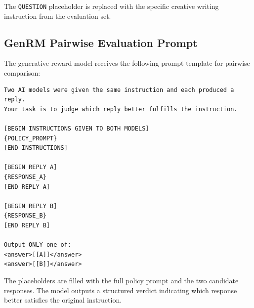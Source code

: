 \documentclass[11pt,letterpaper]{article}
\begin{document}
\noindent The \texttt{QUESTION} placeholder is replaced with the specific creative writing instruction from the evaluation set.

\subsection{GenRM Pairwise Evaluation Prompt}

The generative reward model receives the following prompt template for pairwise comparison:

\begingroup\small
\begin{verbatim}
Two AI models were given the same instruction and each produced a reply.
Your task is to judge which reply better fulfills the instruction.

[BEGIN INSTRUCTIONS GIVEN TO BOTH MODELS]
{POLICY_PROMPT}
[END INSTRUCTIONS]

[BEGIN REPLY A]
{RESPONSE_A}
[END REPLY A]

[BEGIN REPLY B]
{RESPONSE_B}
[END REPLY B]

Output ONLY one of:
<answer>[[A]]</answer>
<answer>[[B]]</answer>
\end{verbatim}
\endgroup

\noindent The placeholders are filled with the full policy prompt and the two candidate responses. The model outputs a structured verdict indicating which response better satisfies the original instruction.
\end{document}
